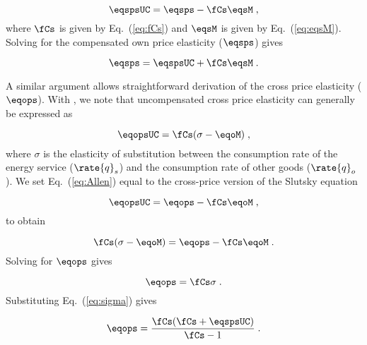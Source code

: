 \begin{equation} \label{eq:slutsky}
  \eqspsUC = \eqsps - \fCs \eqsM \; ,
\end{equation}
%
where $\fCs$ is given by Eq.~(\ref{eq:fCs}) and 
$\eqsM$ is given by Eq.~(\ref{eq:eqsM}).
Solving for the compensated own price elasticity ($\eqsps$) gives

\begin{equation} \label{eq:eqsps}
  \eqsps = \eqspsUC + \fCs \eqsM \; .
\end{equation}

A similar argument allows straightforward derivation 
of the cross price elasticity ($\eqops$).
With \citet{Hicks1934}, 
we note that uncompensated cross price elasticity 
can generally be expressed as

\begin{equation} \label{eq:Allen}
  \eqopsUC = \fCs (\sigma - \eqoM) \; ,
\end{equation}
%
where $\sigma$ is the elasticity of substitution 
between the consumption rate of the energy service ($\rate{q}_s$) and
the consumption rate of other goods ($\rate{q}_o$). 
We set Eq.~(\ref{eq:Allen}) equal to 
the cross-price version of the Slutsky equation

\begin{equation} \label{eq:slutsky_cross}
  \eqopsUC = \eqops - \fCs \eqoM \; ,
\end{equation}
%
to obtain

\begin{equation}
  \fCs (\sigma - \eqoM) = \eqops - \fCs \eqoM \; .
\end{equation}
%
Solving for $\eqops$ gives

\begin{equation} \label{eq:eqops_general}
  \eqops = \fCs \sigma \; .
\end{equation}
%
Substituting Eq.~(\ref{eq:sigma}) gives

\begin{equation} \label{eq:eqops}
  \eqops = \frac{\fCs (\fCs + \eqspsUC)}{\fCs - 1} \; .
\end{equation}









